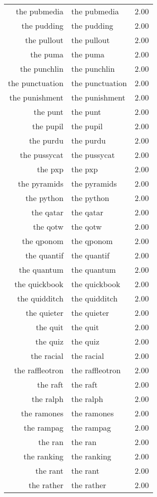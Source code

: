 \begin{table}[ht]
\begin{tabular}{rlr}
  the pubmedia & the pubmedia & 2.00 \\ 
  the pudding & the pudding & 2.00 \\ 
  the pullout & the pullout & 2.00 \\ 
  the puma & the puma & 2.00 \\ 
  the punchlin & the punchlin & 2.00 \\ 
  the punctuation & the punctuation & 2.00 \\ 
  the punishment & the punishment & 2.00 \\ 
  the punt & the punt & 2.00 \\ 
  the pupil & the pupil & 2.00 \\ 
  the purdu & the purdu & 2.00 \\ 
  the pussycat & the pussycat & 2.00 \\ 
  the pxp & the pxp & 2.00 \\ 
  the pyramids & the pyramids & 2.00 \\ 
  the python & the python & 2.00 \\ 
  the qatar & the qatar & 2.00 \\ 
  the qotw & the qotw & 2.00 \\ 
  the qponom & the qponom & 2.00 \\ 
  the quantif & the quantif & 2.00 \\ 
  the quantum & the quantum & 2.00 \\ 
  the quickbook & the quickbook & 2.00 \\ 
  the quidditch & the quidditch & 2.00 \\ 
  the quieter & the quieter & 2.00 \\ 
  the quit & the quit & 2.00 \\ 
  the quiz & the quiz & 2.00 \\ 
  the racial & the racial & 2.00 \\ 
  the raffleotron & the raffleotron & 2.00 \\ 
  the raft & the raft & 2.00 \\ 
  the ralph & the ralph & 2.00 \\ 
  the ramones & the ramones & 2.00 \\ 
  the rampag & the rampag & 2.00 \\ 
  the ran & the ran & 2.00 \\ 
  the ranking & the ranking & 2.00 \\ 
  the rant & the rant & 2.00 \\ 
  the rather & the rather & 2.00 \\ 

\end{tabular}
\end{table}
